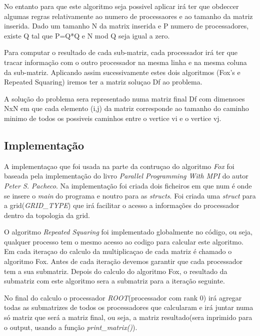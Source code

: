 \documentclass[12pt,a4paper]{article}
\begin{document}
                No entanto para que este algoritmo seja possivel aplicar irá ter que obdeccer algumas regras relativamente ao numero de processaores e ao tamanho da matriz inserida. Dado um tamanho N da matrix inserida e P numero de processadores, existe Q tal que P=Q*Q e N mod Q seja igual a zero.
        
        Para computar o resultado de cada sub-matriz, cada processador irá ter que tracar informação com o outro processador na mesma linha e na mesma coluna da sub-matriz. Aplicando assim sucessivamente estes dois algoritmos (Fox's e Repeated Squaring) iremos ter a matriz soluçao Df ao problema. 

        A solução do problema sera representado numa matriz final Df com dimensoes NxN em que cada elemento (i,j) da matriz corresponde ao tamanho do caminho minimo de todos os possiveis caminhos entre o vertice vi e o vertice vj.
        
        \subsection{Implementação}
            A implementaçao que foi usada na parte da contruçao do algoritmo \textit{Fox} foi baseada pela implementação do livro \textit{Parallel Programming With MPI} do autor \textit{Peter S. Pacheco}. Na implementação foi criada dois ficheiros em que num é onde se insere o \textit{main} do programa e noutro para as \textit{structs}. Foi criada uma \textit{struct} para a grid(\textit{GRID\_TYPE}) que irá facilitar o acesso a informações do processador dentro da topologia da grid. 
            
            O algoritmo \textit{Repeated Squaring} foi implementado globalmente no código, ou seja, qualquer processo tem o mesmo acesso ao codigo para calcular este algoritmo. Em cada iteraçao do calculo da multiplicaçao de cada matriz é chamado o algoritmo Fox. Antes de cada iteração devemos garantir que cada processador tem a sua submatriz. Depois do calculo do algoritmo Fox, o resultado da submatriz com este algoritmo sera a submatriz para a iteração seguinte.
            
            No final do calculo o processador \textit{ROOT}(processador com rank 0) irá agregar todas as submatrizes de todos os processadores que calcularam e irá juntar numa só matriz que será a matriz final, ou seja, a matriz resultado(sera inprimido para o output, usando a função \textit{print\_matrix()}).
            
\end{document}
